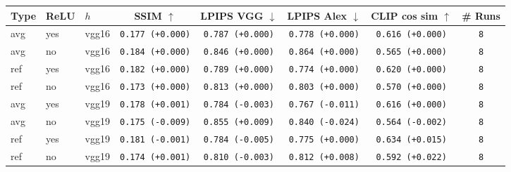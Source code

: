 \begin{tabular}{|l|l|l|c|c|c|c|c|}
\hline
Type & ReLU & $h$ & SSIM $\uparrow$ & LPIPS VGG $\downarrow$ & LPIPS Alex $\downarrow$ & CLIP cos sim $\uparrow$ & \# Runs \\
\hline
\rowcolor{verylightgray}avg & yes & vgg16 & \texttt{0.177 {\color{black}(+0.000)}} & \texttt{0.787 {\color{black}(+0.000)}} & \texttt{0.778 {\color{black}(+0.000)}} & \texttt{0.616 {\color{black}(+0.000)}} & \texttt{8} \\
\rowcolor{verylightgray}avg & no & vgg16 & \texttt{0.184 {\color{black}(+0.000)}} & \texttt{0.846 {\color{black}(+0.000)}} & \texttt{0.864 {\color{black}(+0.000)}} & \texttt{0.565 {\color{black}(+0.000)}} & \texttt{8} \\
\rowcolor{verylightgray}ref & yes & vgg16 & \texttt{0.182 {\color{black}(+0.000)}} & \texttt{0.789 {\color{black}(+0.000)}} & \texttt{0.774 {\color{black}(+0.000)}} & \texttt{0.620 {\color{black}(+0.000)}} & \texttt{8} \\
\rowcolor{verylightgray}ref & no & vgg16 & \texttt{0.173 {\color{black}(+0.000)}} & \texttt{0.813 {\color{black}(+0.000)}} & \texttt{0.803 {\color{black}(+0.000)}} & \texttt{0.570 {\color{black}(+0.000)}} & \texttt{8} \\
\hline
avg & yes & vgg19 & \texttt{0.178 {\color{green}(+0.001)}} & \texttt{0.784 {\color{green}(-0.003)}} & \texttt{0.767 {\color{green}(-0.011)}} & \texttt{0.616 {\color{black}(+0.000)}} & \texttt{8} \\
avg & no & vgg19 & \texttt{0.175 {\color{red}(-0.009)}} & \texttt{0.855 {\color{red}(+0.009)}} & \texttt{0.840 {\color{green}(-0.024)}} & \texttt{0.564 {\color{red}(-0.002)}} & \texttt{8} \\
ref & yes & vgg19 & \texttt{0.181 {\color{red}(-0.001)}} & \texttt{0.784 {\color{green}(-0.005)}} & \texttt{0.775 {\color{black}(+0.000)}} & \texttt{0.634 {\color{green}(+0.015)}} & \texttt{8} \\
ref & no & vgg19 & \texttt{0.174 {\color{green}(+0.001)}} & \texttt{0.810 {\color{green}(-0.003)}} & \texttt{0.812 {\color{red}(+0.008)}} & \texttt{0.592 {\color{green}(+0.022)}} & \texttt{8} \\
\hline
\end{tabular}
